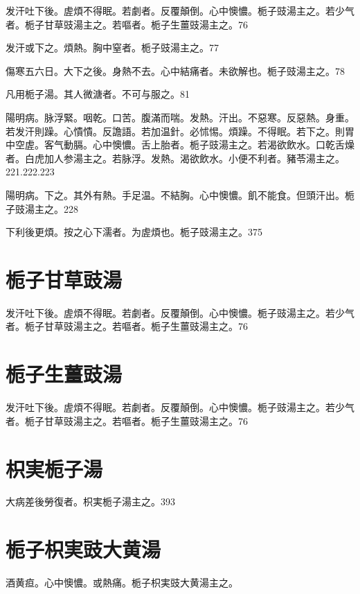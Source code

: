 \documentclass[b5paper,twoside,zihao=-4,UTF8]{ctexbook}
\begin{document}
发汗吐下後。虗煩不得眠。若劇者。反覆顛倒。心中懊憹。栀子{豉}湯主之。若少气者。栀子甘草{豉}湯主之。若嘔者。栀子生薑{豉}湯主之。76

发汗或下之。煩熱。胸中窒者。栀子{豉}湯主之。77

傷寒五六日。大下之後。身熱不去。心中結痛者。未欲解也。栀子{豉}湯主之。78

凡用栀子湯。其人微溏者。不可与服之。81

陽明病。脉浮緊。咽乾。口苦。腹滿而喘。发熱。汗出。不惡寒。反惡熱。身重。若发汗則躁。心憒憒。反譫語。若加温針。必怵惕。煩躁。不得眠。若下之。則胃中空虗。客气動膈。心中懊憹。舌上胎者。栀子{豉}湯主之。若渴欲飲水。口乾舌燥者。白虎{加人参}湯主之。若脉浮。发熱。渴欲飲水。小便不利者。豬苓湯主之。221.222.223

陽明病。下之。其外有熱。手足温。不結胸。心中懊憹。飢不能食。但頭汗出。栀子{豉}湯主之。228

下利後更煩。按之心下濡者。为虗煩也。栀子{豉}湯主之。375

\section{栀子甘草豉湯}

发汗吐下後。虗煩不得眠。若劇者。反覆顛倒。心中懊憹。栀子{豉}湯主之。若少气者。栀子甘草{豉}湯主之。若嘔者。栀子生薑{豉}湯主之。76

\section{栀子生薑豉湯}

发汗吐下後。虗煩不得眠。若劇者。反覆顛倒。心中懊憹。栀子{豉}湯主之。若少气者。栀子甘草{豉}湯主之。若嘔者。栀子生薑{豉}湯主之。76

\section{枳実栀子湯}

大病差後勞復者。枳実栀子湯主之。393

\section{栀子枳実豉大黄湯}

酒黄疸。心中懊憹。或熱痛。栀子{枳実豉}大黄湯主之。
\end{document}
